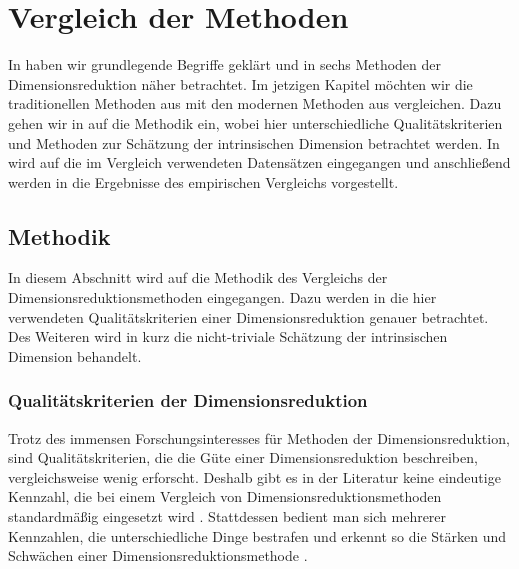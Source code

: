 \chapter{Vergleich der Methoden}
\label{ch:Vergleich}

In  haben wir grundlegende Begriffe geklärt und in
 sechs Methoden der Dimensionsreduktion näher betrachtet. Im jetzigen
Kapitel möchten wir die traditionellen Methoden aus  mit
den modernen Methoden aus  vergleichen. Dazu gehen wir in
 auf die Methodik ein, wobei hier unterschiedliche
Qualitätskriterien und Methoden zur Schätzung der intrinsischen Dimension betrachtet werden. In
 wird auf die im Vergleich verwendeten Datensätzen
eingegangen und anschließend werden in  die Ergebnisse des
empirischen Vergleichs vorgestellt.

\section{Methodik}
\label{ch:Vergleich:sec:Methodik}

In diesem Abschnitt wird auf die Methodik des Vergleichs der Dimensionsreduktionsmethoden
eingegangen. Dazu werden in  die
hier verwendeten Qualitätskriterien einer Dimensionsreduktion genauer betrachtet. Des Weiteren wird
in  kurz die
nicht-triviale Schätzung der intrinsischen Dimension behandelt. 
\subsection{Qualitätskriterien der Dimensionsreduktion}
\label{ch:Vergleich:sec:Methodik:subsec:Qualitaetskriterien}
Trotz des immensen Forschungsinteresses für Methoden der Dimensionsreduktion, sind Qualitätskriterien, die die Güte einer Dimensionsreduktion beschreiben, vergleichsweise wenig erforscht. Deshalb gibt es in der Literatur keine eindeutige Kennzahl, die bei einem Vergleich von Dimensionsreduktionsmethoden standardmäßig eingesetzt wird \parencite[vgl.][1 -- 2]{Lee.2009}. Stattdessen bedient man sich mehrerer Kennzahlen, die
unterschiedliche Dinge bestrafen und erkennt so die Stärken und Schwächen einer
Dimensionsreduktionsmethode \parencite[486]{Venna.2001}.

